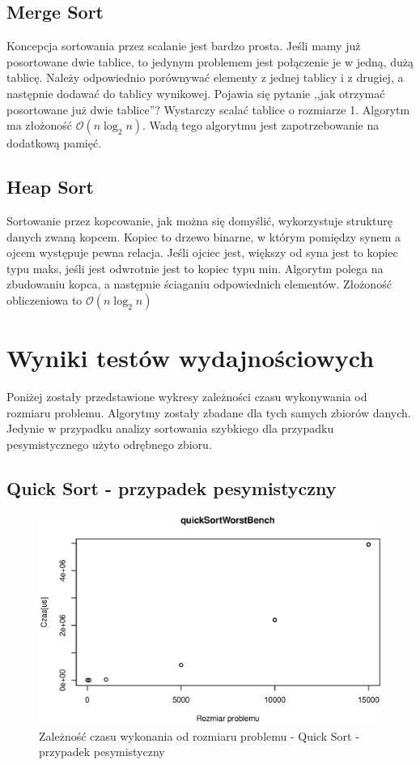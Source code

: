 \documentclass[10pt,a4paper]{article}
\begin{document}
\subsection{Merge Sort}

Koncepcja sortowania przez scalanie jest bardzo prosta. Jeśli mamy już posortowane dwie tablice,
to jedynym problemem jest połączenie je w jedną, dużą tablicę. Należy odpowiednio porównywać
elementy z jednej tablicy i z drugiej, a następnie dodawać do tablicy wynikowej. Pojawia się
pytanie ,,jak otrzymać posortowane już dwie tablice''? Wystarczy scalać tablice o rozmiarze 1.
Algorytm ma złożoność $\mathcal{O}(n\log_2 n )$. Wadą tego algorytmu jest zapotrzebowanie na
dodatkową pamięć.

\subsection{Heap Sort}

Sortowanie przez kopcowanie, jak można się domyślić, wykorzystuje strukturę danych zwaną kopcem.
Kopiec to drzewo binarne, w którym pomiędzy synem a ojcem występuje pewna relacja. Jeśli ojciec jest,
większy od syna jest to kopiec typu maks, jeśli jest odwrotnie jest to kopiec typu min. Algorytm polega
na zbudowaniu kopca, a następnie ściaganiu odpowiednich elementów. Złożoność obliczeniowa to 
$\mathcal{O}(n\log_2 n)$

\section{Wyniki testów wydajnościowych}

Poniżej zostały przedstawione wykresy zależności czasu wykonywania od rozmiaru problemu.
Algorytmy zostały zbadane dla tych samych zbiorów danych. Jedynie w przypadku analizy 
sortowania szybkiego dla przypadku pesymistycznego użyto odrębnego zbioru.

\subsection{Quick Sort - przypadek pesymistyczny}

\begin{figure}[H]
\centering
\includegraphics[width=0.7\linewidth]{./Wykresy/quickSortWorstBench}
\caption{Zależność czasu wykonania od rozmiaru problemu - Quick Sort - przypadek pesymistyczny}
\label{fig:quickSortWorstBench}
\end{figure}
\end{document}
